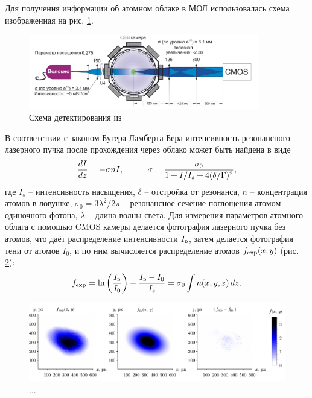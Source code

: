 Для получения информации об атомном облаке в МОЛ использовалась схема изображенная на рис. \ref{fig:exp_photo}. 

\begin{figure}[h]
    \centering
    \includegraphics[width=0.9\textwidth]{figs/detect.png}
    \caption{Схема детектирования из \cite{vlad}}
    \label{fig:exp_photo}
\end{figure}


В соответствии с законом Бугера-Ламберта-Бера интенсивность резонансного лазерного пучка после прохождения через облако может быть найдена в виде
\begin{equation}
    \frac{d I}{d z} = - \sigma n I,
    \hspace{10 mm} 
    \sigma = \frac{\sigma_0}{1+I/I_s + 4 (\delta/\Gamma)^2},
\end{equation}
где $I_s$ -- интенсивность насыщения, $\delta$ -- отстройка от резонанса, $n$ -- концентрация атомов в ловушке, $\sigma_0 = 3 \lambda^2 / 2\pi$ -- резонансное сечение поглощения атомом одиночного фотона, $\lambda$ -- длина волны света. Для измерения параметров атомного облага с помощью CMOS камеры делается фотография лазерного пучка без атомов, что даёт распределение интенсивности $\subt{I}{D}$, затем делается фотография тени от атомов $I_0$, и по ним вычисляется распределение атомов $f_{\textnormal{exp}}(x, y)$ (рис. \ref{fig:fitmot}):
\begin{equation}
    \sub{f}{exp} = \ln\left(\frac{\subt{I}{D}}{I_0}\right) + \frac{\subt{I}{D} - I_0}{I_s} = \sigma_0 \int n(x, y, z) \d z.
\end{equation}





\begin{figure}[h]
    \centering
    \includegraphics{figs/fit_mot.pdf}
    \caption{...}
    \label{fig:fitmot}
\end{figure}



